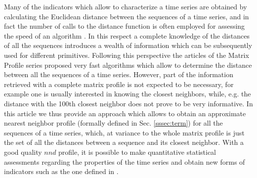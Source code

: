 \documentclass[a4paper,twoside]{article}
\begin{document}
Many of the indicators which allow to characterize a time series are obtained by calculating the Euclidean distance between the sequences of a time series, and in fact the number of calls to the distance function is often employed for assessing the speed of an algorithm \cite{senin}. In this respect a complete knowledge of the distances of all the sequences introduces a wealth of information which can be subsequently used for different primitives. Following this perspective the articles of the Matrix Profile series \cite{matrix1} \cite{matrix2} proposed very fast algorithms which allow to determine the distance between all the sequences of a time series. However, part of the information retrieved with a complete matrix profile is not expected to be necessary, for example one is usually interested in knowing the closest neighbors, while, e.g. the distance with the 100th closest neighbor does not prove to be very informative. 
In this article we thus provide an approach which allows to obtain an approximate nearest neighbor profile (formally defined in Sec. \ref{sssec:term}) for all the sequences of a time series, which, at variance to the whole matrix profile is just the set of all the distances between a sequence and its closest neighbor. With a good quality $nnd$ profile, it is possible to make quantitative statistical assessments regarding the properties of the time series and obtain new forms of indicators such as the one defined in \cite{sod}. 


















% 
\end{document}
